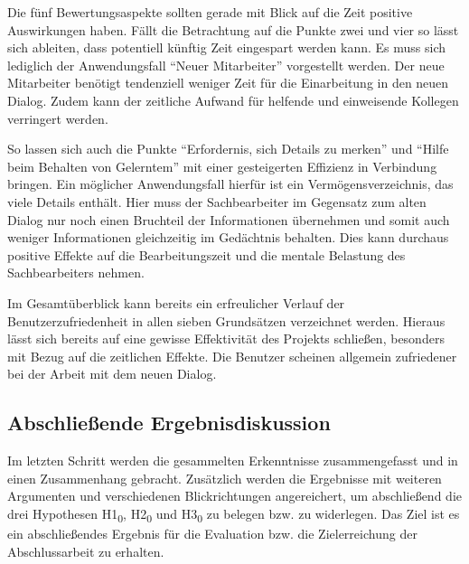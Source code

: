 Die fünf Bewertungsaspekte sollten gerade mit Blick auf die Zeit positive Auswirkungen haben. Fällt die Betrachtung auf die Punkte zwei und vier so lässt sich ableiten, dass potentiell künftig Zeit eingespart werden kann. Es muss sich lediglich der Anwendungsfall \enquote{Neuer Mitarbeiter} vorgestellt werden. Der neue Mitarbeiter benötigt tendenziell weniger Zeit für die Einarbeitung in den neuen Dialog. Zudem kann der zeitliche Aufwand für helfende und einweisende Kollegen verringert werden.

So lassen sich auch die Punkte \enquote{Erfordernis, sich Details zu merken} und \enquote{Hilfe beim Behalten von Gelerntem} mit einer gesteigerten Effizienz in Verbindung bringen. Ein möglicher Anwendungsfall hierfür ist ein Vermögensverzeichnis, das viele Details enthält. Hier muss der Sachbearbeiter im Gegensatz zum alten Dialog nur noch einen Bruchteil der Informationen übernehmen und somit auch weniger Informationen gleichzeitig im Gedächtnis behalten. Dies kann durchaus positive Effekte auf die Bearbeitungszeit und die mentale Belastung des Sachbearbeiters nehmen.

Im Gesamtüberblick kann bereits ein erfreulicher Verlauf der Benutzerzufriedenheit in allen sieben Grundsätzen verzeichnet werden. Hieraus lässt sich bereits auf eine gewisse Effektivität des Projekts schließen, besonders mit Bezug auf die zeitlichen Effekte. Die Benutzer scheinen allgemein zufriedener bei der Arbeit mit dem neuen Dialog.


\subsection{Abschließende Ergebnisdiskussion}
\label{sec:abschliessendeErgebnisdiskussion}
Im letzten Schritt werden die gesammelten Erkenntnisse zusammengefasst und in einen Zusammenhang gebracht. Zusätzlich werden die Ergebnisse mit weiteren Argumenten und verschiedenen Blickrichtungen angereichert, um abschließend die drei Hypothesen H1\textsubscript{0}, H2\textsubscript{0} und H3\textsubscript{0} zu belegen bzw. zu widerlegen. Das Ziel ist es ein abschließendes Ergebnis für die Evaluation bzw. die Zielerreichung der Abschlussarbeit zu erhalten.


